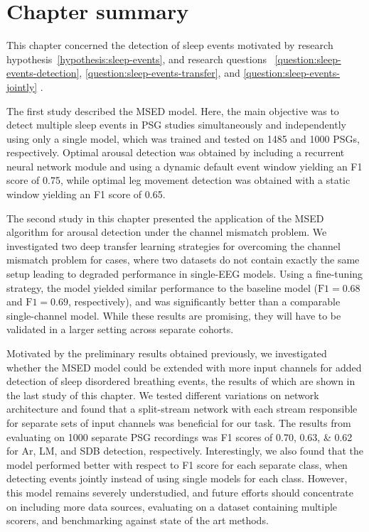 \section{Chapter summary}\label{sec:eventdetection-summary}
This%
chapter concerned the detection of sleep events motivated by research hypothesis~\ref{hypothesis:sleep-events}, and research questions~%
\ref{question:sleep-events-detection}, %
\ref{question:sleep-events-transfer}, and %
\ref{question:sleep-events-jointly}%
%
%
.

The first study described the \ac{MSED} model.
Here, the main objective was to detect multiple sleep events in \ac{PSG} studies simultaneously and independently using only a single model, which was trained and tested on 1485 and 1000 \acp{PSG}, respectively. 
Optimal arousal detection was obtained by including a recurrent neural network module and using a dynamic default event window yielding an F1 score of 0.75, while optimal leg movement detection was obtained with a static window yielding an F1 score of 0.65.

The second study in this chapter presented the application of the \ac{MSED} algorithm for arousal detection under the channel mismatch problem.
We investigated two deep transfer learning strategies for overcoming the channel mismatch problem for cases, where two datasets do not contain exactly the same setup leading to degraded performance in single-\ac{EEG} models. 
Using a fine-tuning strategy, the model yielded similar performance to the baseline model (\(\mathrm{F1}=0.68\) and \(\mathrm{F1}=0.69\), respectively), and was significantly better than a comparable single-channel model.
While these results are promising, they will have to be validated in a larger setting across separate cohorts.

Motivated by the preliminary results obtained previously, we investigated whether the \ac{MSED} model could be extended with more input channels for added detection of sleep disordered breathing events, the results of which are shown in the last study of this chapter.
We tested different variations on network architecture and found that a split-stream network with each stream responsible for separate sets of input channels was beneficial for our task.
The results from evaluating on 1000 separate \ac{PSG} recordings was F1 scores of \numlist{0.70;0.63;0.62} for \ac{Ar}, \ac{LM}, and \ac{SDB} detection, respectively.
Interestingly, we also found that the model performed better with respect to F1 score for each separate class, when detecting events jointly instead of using single models for each class.
However, this model remains severely understudied, and future efforts should concentrate on including more data sources, evaluating on a dataset containing multiple scorers, and benchmarking against state of the art methods.



